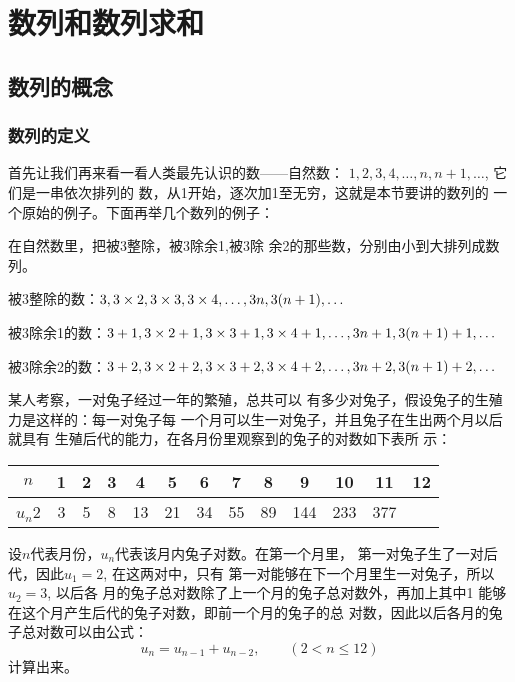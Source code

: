\chapter{数列和数列求和}

\section{数列的概念}
\subsection{数列的定义}

首先让我们再来看一看人类最先认识的数——自然数：
$1,2,3,4,\ldots,n,n+1,\ldots$, 它们是一串依次排列的
数，从1开始，逐次加1至无穷，这就是本节要讲的数列的
一个原始的例子。下面再举几个数列的例子：

\begin{example}
    在自然数里，把被3整除，被3除余1,被3除
余2的那些数，分别由小到大排列成数列。
\end{example}

\begin{solution}
    被3整除的数：$3,3\times2,3\times3,3\times4,\ldots,3n,3(n+1),\ldots$

被3除余1的数：$3+1,3\times2+1,3\times3+1,3\times4+1,\ldots,3n+1,3(n+1)+1,\ldots$

被3除余2的数：$3+2,3\times2+2,3\times3+2,3\times4+2,\ldots , 3n+2,3(n+1) +2,\ldots$
\end{solution}

\begin{example}
    某人考察，一对兔子经过一年的繁殖，总共可以
有多少对兔子，假设兔子的生殖力是这样的：每一对兔子每
一个月可以生一对兔子，并且兔子在生出两个月以后就具有
生殖后代的能力，在各月份里观察到的兔子的对数如下表所
示：
\begin{center}
\begin{tabular}{c|cccccccccccc}
\hline
$n$&1&2&3&4&5&6&7&8&9&10&11&12\\
\hline
$u_n$2&3&5&8&13&21&34&55&89&144&233&377\\
\hline
\end{tabular}
\end{center}

设$n$代表月份，$u_n$代表该月内兔子对数。在第一个月里，
第一对兔子生了一对后代，因此$u_1=2$, 在这两对中，只有
第一对能够在下一个月里生一对兔子，所以$u_2=3$, 以后各
月的兔子总对数除了上一个月的兔子总对数外，再加上其中1
能够在这个月产生后代的兔子对数，即前一个月的兔子的总
对数，因此以后各月的兔子总对数可以由公式：
\[u_n=u_{n-1}+u_{n-2},\qquad (2<n\le 12)\]
计算出来。
\end{example}

